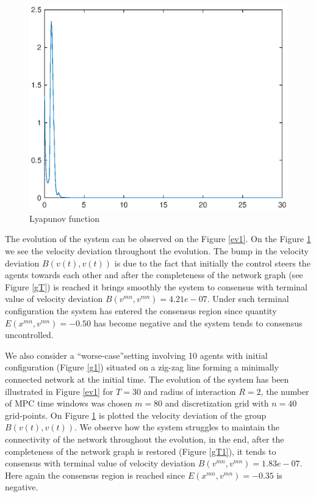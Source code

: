 \documentclass[a4paper,10pt, english]{article}
\begin{document}
 
 \begin{figure}[ht]
 \centering
 \includegraphics[scale=0.5]{figures/a5D_L+V_fine_mesh_NICE_lv.eps}
 \caption{Lyapunov function}
 \label{lf}
 \end{figure}
  \newpage
The evolution of the system can be observed on the Figure \ref{ev1}. On the Figure \ref{lf} we see the velocity deviation throughout the evolution. The bump in the velocity deviation $B(v(t), v(t))$
is due to the fact that initially the control steers the agents towards each other and after the completeness of the network graph (see Figure \ref{gT}) is reached it brings smoothly the system to consensus with terminal value of velocity deviation $B(v^{mn}, v^{mn}) = 4.21e-07$. Under such terminal configuration the system has entered the consensus region since quantity $E(x^{mn}, v^{mn}) = -0.50$ has become negative and the system tends to consensus uncontrolled.
 
We also  consider a \textquotedblleft worse-case\textquotedblright setting involving 10 agents with initial configuration (Figure \ref{g1}) situated on a  zig-zag line forming a minimally connected network at the initial time. The evolution of the system has been illustrated in Figure \ref{ev1} for $T = 30$ and radius of interaction $R = 2$, the number of MPC time windows was chosen $m = 80$  and discretization grid with $n = 40$ grid-points.  On Figure \ref{lf} is plotted the velocity deviation of the group $B(v(t), v(t))$. We observe how the system struggles to maintain the connectivity of the network throughout the evolution, in the end, after the completeness of the network graph is restored (Figure \ref{gT1}), it tends to consensus with terminal value of velocity deviation $B(v^{mn}, v^{mn}) = 1.83e-07$. Here again the consensus region is reached since $E(x^{mn}, v^{mn}) = -0.35$ is negative. 
 
\end{document}
